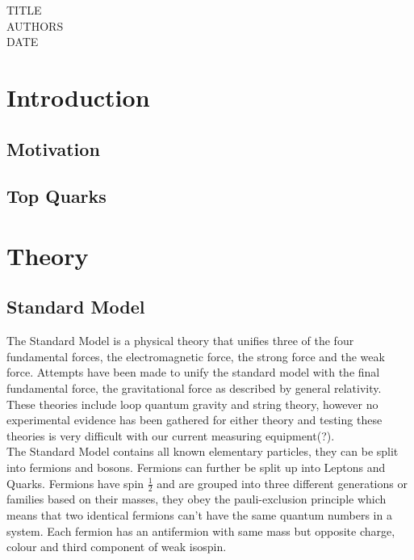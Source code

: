 \documentclass[11pt,a4paper]{article}
\begin{document}
TITLE\\
AUTHORS\\
DATE

\cleardoublepage{}
\begin{abstract}
  
\end{abstract}
\cleardoublepage{}
\tableofcontents{}
\section{Introduction}

\subsection{Motivation}

\subsection{Top Quarks}

\section{Theory}

\subsection{Standard Model}
The Standard Model is a physical theory that unifies three of the four fundamental forces, the electromagnetic force, the strong force and the weak force. Attempts have been made to unify the standard model with the final fundamental force, the gravitational force as described by general relativity. These theories include loop quantum gravity and string theory, however no experimental evidence has been gathered for either theory and testing these theories is very difficult with our current measuring equipment(?). \\

The Standard Model contains all known elementary particles, they can be split into fermions and bosons. Fermions can further be split up into Leptons and Quarks.  Fermions have spin $\frac{1}{2}$ and are grouped into three different generations or families based on their masses, they obey the pauli-exclusion principle which means that two identical fermions can't have the same quantum numbers in a system. Each fermion has an antifermion with same mass but opposite charge, colour and third component of weak isospin. \\
\end{document}
